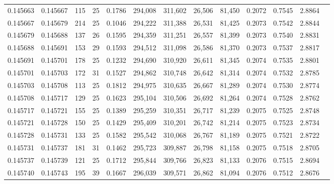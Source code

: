 \begin{tabular}{rrrrrrrrrrrrr}
0.145663 & 0.145667 & 115 &  25 &                                     0.1786 & 294,008 & 311,602 &  26,506 &  81,450 & 0.2072 & 0.7545 & 2.8864 \\
0.145667 & 0.145679 & 214 &  25 &                                     0.1046 & 294,222 & 311,388 &  26,531 &  81,425 & 0.2073 & 0.7542 & 2.8844 \\
0.145679 & 0.145688 & 137 &  26 &                                     0.1595 & 294,359 & 311,251 &  26,557 &  81,399 & 0.2073 & 0.7540 & 2.8831 \\
0.145688 & 0.145691 & 153 &  29 &                                     0.1593 & 294,512 & 311,098 &  26,586 &  81,370 & 0.2073 & 0.7537 & 2.8817 \\
0.145691 & 0.145701 & 178 &  25 &                                     0.1232 & 294,690 & 310,920 &  26,611 &  81,345 & 0.2074 & 0.7535 & 2.8801 \\
0.145701 & 0.145703 & 172 &  31 &                                     0.1527 & 294,862 & 310,748 &  26,642 &  81,314 & 0.2074 & 0.7532 & 2.8785 \\
0.145703 & 0.145708 & 113 &  25 &                                     0.1812 & 294,975 & 310,635 &  26,667 &  81,289 & 0.2074 & 0.7530 & 2.8774 \\
0.145708 & 0.145717 & 129 &  25 &                                     0.1623 & 295,104 & 310,506 &  26,692 &  81,264 & 0.2074 & 0.7528 & 2.8762 \\
0.145717 & 0.145721 & 155 &  25 &                                     0.1389 & 295,259 & 310,351 &  26,717 &  81,239 & 0.2075 & 0.7525 & 2.8748 \\
0.145721 & 0.145728 & 150 &  25 &                                     0.1429 & 295,409 & 310,201 &  26,742 &  81,214 & 0.2075 & 0.7523 & 2.8734 \\
0.145728 & 0.145731 & 133 &  25 &                                     0.1582 & 295,542 & 310,068 &  26,767 &  81,189 & 0.2075 & 0.7521 & 2.8722 \\
0.145731 & 0.145737 & 181 &  31 &                                     0.1462 & 295,723 & 309,887 &  26,798 &  81,158 & 0.2075 & 0.7518 & 2.8705 \\
0.145737 & 0.145739 & 121 &  25 &                                     0.1712 & 295,844 & 309,766 &  26,823 &  81,133 & 0.2076 & 0.7515 & 2.8694 \\
0.145740 & 0.145743 & 195 &  39 &                                     0.1667 & 296,039 & 309,571 &  26,862 &  81,094 & 0.2076 & 0.7512 & 2.8676 \\

\end{tabular}
